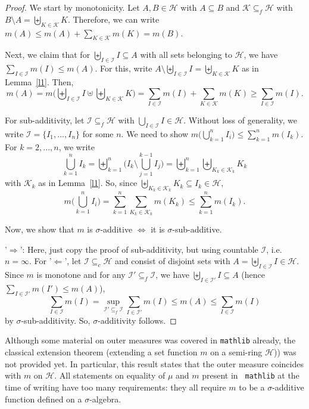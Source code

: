 \documentclass[lean]{DraftAFM}
\begin{document}
\begin{proof}
  We start by monotonicity. Let $A, B\in\mathcal H$ with $A\subseteq
  B$ and $\mathcal K \subseteq_f \mathcal H$ with $B \setminus A =
  \biguplus_{K\in\mathcal K} K$. Therefore, we can write $m(A) \leq
  m(A) + \sum_{K\in\mathcal K} m(K) = m(B)$.

  Next, we claim that for $\biguplus_{I\in\mathcal I} I \subseteq A$
  with all sets belonging to $\mathcal H$, we have $\sum_{I \in \mathcal
    I} m(I) \leq m(A)$. For this, write $A \setminus \biguplus_{I\in
    \mathcal I} I = \biguplus_{K\in\mathcal K} K$ as in
  Lemma~\ref{l1}. Then,
  $$ m(A) = m\Big(\biguplus_{I\in\mathcal I} I \uplus
  \biguplus_{K\in\mathcal K} K\Big) = \sum_{I\in\mathcal I} m(I) +
  \sum_{K\in\mathcal K} m(K) \geq \sum_{I\in\mathcal I} m(I). $$

  For sub-additivity, let $\mathcal I \subseteq_f \mathcal H$ with
  $\bigcup_{I \in \mathcal I} I \in \mathcal H$. Without loss of
  generality, we write $\mathcal I = \{I_1,...,I_n\}$ for some $n$. We
  need to show $m\Big(\bigcup_{k=1}^n I_i\Big) \leq \sum_{k=1}^n
  m(I_k)$. For $k=2,...,n$, we write
  $$ \bigcup_{k=1}^n I_k = \biguplus_{k=1}^n \Big(I_k \setminus
  \bigcup_{j=1}^{k-1} I_j\Big) = \biguplus_{k=1}^n \biguplus_{K_k \in
    \mathcal K_k} K_k$$ with $\mathcal K_k$ as in Lemma~\ref{l1}. So,
  since $\biguplus_{K_k \in \mathcal K_k} K_k \subseteq I_k \in
  \mathcal H$,
  $$ m\Big(\bigcup_{k=1}^n I_i\Big) = \sum_{k=1}^n \sum_{K_k \in
    \mathcal K_k} m(K_k) \leq \sum_{k=1}^n m(I_k).$$

  \noindent
  Now, we show that $m$ is $\sigma$-additive $\iff$ it is
  $\sigma$-sub-additive.

  \noindent
  '$\Rightarrow$': Here, just copy the proof of sub-additivity, but
  using countable $\mathcal I$, i.e.\ $n=\infty$. For '$\Leftarrow$',
  let $\mathcal I \subseteq_c \mathcal H$ and consist of
  disjoint sets with $A = \biguplus_{I \in \mathcal I} I \in\mathcal
  H$. Since $m$ is monotone and for any $\mathcal I' \subseteq_f
  \mathcal I$, we have $\biguplus_{I\in\mathcal I'} I \subseteq A$
  (hence $\sum_{I \in \mathcal I'} m(I') \leq m(A)$),
  $$ \sum_{I \in \mathcal I} m(I) = \sup_{\mathcal I' \subseteq_f
    \mathcal I} \sum_{I \in \mathcal I'} m(I) \leq m(A) \leq \sum_{I
    \in \mathcal I} m(I)$$ by $\sigma$-sub-additivity. So,
  $\sigma$-additivity follows.
\end{proof}

\noindent
Although some material on outer measures was covered in {\tt mathlib}
already, the classical extension theorem (extending a set function $m$
on a semi-ring $\mathcal H$)) was not provided yet. In particular, this
result states that the outer measure coincides with $m$ on $\mathcal
H$. All statements on equality of $\mu$ and $m$ present in {\tt
  mathlib} at the time of writing have too many requirements: they all require $m$ to be a $\sigma$-additive function defined on a $\sigma$-algebra.
\end{document}
